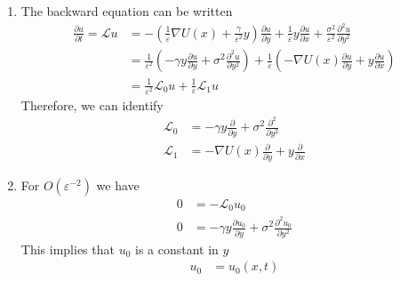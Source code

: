 \documentclass[12pt]{article}
\theoremstyle{plain}
\theoremstyle{definition}
\theoremstyle{remark}
\begin{document}
\begin{enumerate}
\begin{enumerate}
      \item %
        The backward equation can be written
        \begin{align*}
          \frac{\partial u}{\partial t}
          =
          \mathscr{L}u
          &=
          -\left(\frac{1}{\varepsilon}\nabla U(x) + \frac{\gamma}{\varepsilon^2} y\right)
          \frac{\partial u}{\partial y}
          +\frac{1}{\varepsilon} y
          \frac{\partial u}{\partial x}
          +
          \frac{\sigma^2}{\varepsilon^2}
          \frac{\partial^2 u}{\partial y^2} \\
          &=
          \frac{1}{\varepsilon^2}
            \left(
              -\gamma y \frac{\partial u}{\partial y}
              +\sigma^2 \frac{\partial^2 u}{\partial y^2}
            \right)
          +
          \frac{1}{\varepsilon}
          \left(
            -\nabla U(x) \frac{\partial u}{\partial y}
            + y \frac{\partial u}{\partial x}
          \right)\\
          &=
          \frac{1}{\varepsilon^2} \mathscr{L}_0u
          +
          \frac{1}{\varepsilon} \mathscr{L}_1u
        \end{align*}
        Therefore, we can identify
        \begin{align*}
          \mathscr{L}_0 &=
            -\gamma y \frac{\partial }{\partial y}
            +\sigma^2 \frac{\partial^2 }{\partial y^2} \\
          \mathscr{L}_1 &=
            -\nabla U(x) \frac{\partial }{\partial y}
            + y \frac{\partial }{\partial x}
        \end{align*}

      \item %
        For $O(\varepsilon^{-2})$ we have
        \begin{align*}
          0 &= -\mathscr{L}_0u_0 \\
          0 &= -\gamma y \frac{\partial u_0}{\partial y}
            +\sigma^2 \frac{\partial^2 u_0}{\partial y^2}
        \end{align*}
        This implies that $u_0$ is a constant in $y$
        \begin{align*}
          u_0 &= u_0(x,t)
        \end{align*}


\end{enumerate}
\end{enumerate}
\end{document}

